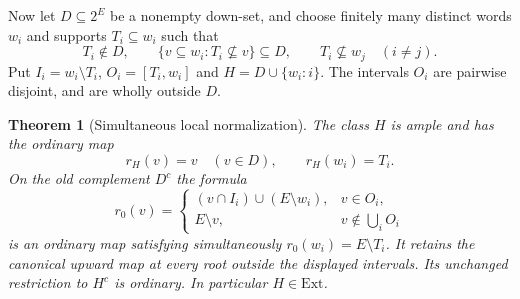 \documentclass[11pt]{article}
\newtheorem{theorem}{Theorem}[section]
\theoremstyle{definition}
\begin{document}
Now let $D\subseteq2^E$ be a nonempty down-set, and choose finitely many
distinct words $w_i$ and supports
$T_i\subseteq w_i$ such that
\begin{equation}\label{eq:guarded-conditions}
 T_i\notin D,\qquad
 \{v\subseteq w_i:T_i\nsubseteq v\}\subseteq D,\qquad
 T_i\nsubseteq w_j\quad(i\ne j).
\end{equation}
Put $I_i=w_i\setminus T_i$, $O_i=[T_i,w_i]$ and
$H=D\cup\{w_i:i\}$. The intervals $O_i$ are pairwise disjoint,
and are wholly outside $D$.

\begin{theorem}[Simultaneous local normalization]\label{thm:guarded-pins}
The class $H$ is ample and has the ordinary map
\[
 r_H(v)=v\quad(v\in D),\qquad r_H(w_i)=T_i.
\]
On the old complement $D^c$ the formula
\begin{equation}\label{eq:guarded-map}
 r_0(v)=
 \begin{cases}
 (v\cap I_i)\cup(E\setminus w_i),&v\in O_i,\\
 E\setminus v,&v\notin\bigcup_i O_i
 \end{cases}
\end{equation}
is an ordinary map satisfying simultaneously
$r_0(w_i)=E\setminus T_i$. It retains the canonical upward map at
every root outside the displayed intervals. Its unchanged restriction
to $H^c$ is ordinary. In particular $H\in\mathrm{Ext}$.
\end{theorem}
\end{document}
